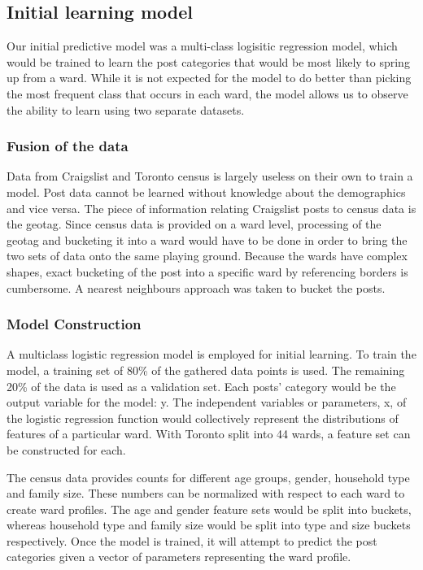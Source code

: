 \documentclass[12pt]{article}
\begin{document}
\subsection{Initial learning model}
Our initial predictive model was a multi-class logisitic regression model, which would be trained to learn the post categories that would be most likely to spring up from a ward. While it is not expected for the model to do better than picking the most frequent class that occurs in each ward, the model allows us to observe the ability to learn using two separate datasets.  

\subsubsection{Fusion of the data}
Data from Craigslist and Toronto census is largely useless on their own to train a model. Post data cannot be learned without knowledge about the demographics and vice versa. The piece of information relating Craigslist posts to census data is the geotag. Since census data is provided on a ward level, processing of the geotag and bucketing it into a ward would have to be done in order to bring the two sets of data onto the same playing ground. Because the wards have complex shapes, exact bucketing of the post into a specific ward by referencing borders is cumbersome. A nearest neighbours approach was taken to bucket the posts.


\subsubsection{Model Construction}
A multiclass logistic regression model is employed for initial learning. To train the model, a training set of 80\% of the gathered data points is used. The remaining 20\% of the data is used as a validation set. Each posts' category would be the output variable for the model: y. The independent variables or parameters, x, of the logistic regression function would collectively represent the distributions of features of a particular ward. With Toronto split into 44 wards, a feature set can be constructed for each.

The census data provides counts for different age groups, gender, household type and family size. These numbers can be normalized with respect to each ward to create ward profiles. The age and gender feature sets would be split into buckets, whereas household type and family size would be split into type and size buckets respectively. Once the model is trained, it will attempt to predict the post categories given a vector of parameters representing the ward profile. 
\end{document}
